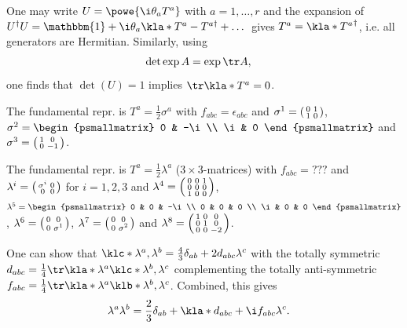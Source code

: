\documentclass[english, parskip=full]{scrbook}
\newcommand{\example}[3]{\begin{tcolorbox}[colback=colorbackgroundexample,colframe=colorexample, breakable,enhanced,title={\textbf{#1}: #2.}]#3\end{tcolorbox}}
\begin{document}
One may write $U=\powe{\i \theta_a T^a}$ with $a=1,\dots,r$ and the expansion of $U^\dagger U = \mathbbm{1} + \i\theta_a \kla*{T^a - T^{a\dagger}} + \dots$ gives $T^a = \kla*{T^a}^\dagger$, i.e. all generators are Hermitian.
Similarly, using 
\begin{align}
\det \exp A &= \exp \tr A,
\end{align}
one finds that $\det(U)=1$ implies $\tr\kla*{T^a}=0$.
\example{$SU(2)$}{\textsc{Pauli} matrices}{
The fundamental repr. is $T^a = \frac{1}{2}\sigma^a$ with $f_{abc}=\epsilon_{abc}$ and $\sigma^1 = \begin{psmallmatrix} 0 & 1 \\ 1 & 0 \end{psmallmatrix}$, $\sigma^2 = \begin{psmallmatrix} 0 & -\i \\ \i & 0 \end{psmallmatrix}$ and $\sigma^3 = \begin{psmallmatrix} 1 & 0 \\ 0 & -1 \end{psmallmatrix}$.
}
\example{$SU(3)$}{\textsc{Gellmann} matrices}{
The fundamental repr. is $T^a = \frac{1}{2}\lambda^a$ ($3\times 3$-matrices) with $f_{abc}=???$ and $\lambda^i = \begin{psmallmatrix} \sigma^i & 0 \\ 0 & 0 \end{psmallmatrix}$ for $i=1,2,3$ and $\lambda^4=\begin{psmallmatrix} 0 & 0 & 1 \\ 0 & 0 & 0 \\ 1 & 0 & 0 \end{psmallmatrix}$, $\lambda^5=\begin{psmallmatrix} 0 & 0 & -\i \\ 0 & 0 & 0 \\ \i & 0 & 0 \end{psmallmatrix}$, $\lambda^6 = \begin{psmallmatrix} 0 & 0 \\ 0 & \sigma^1 \end{psmallmatrix}$, $\lambda^7 = \begin{psmallmatrix} 0 & 0 \\ 0 & \sigma^2 \end{psmallmatrix}$ and $\lambda^8=\begin{psmallmatrix} 1 & 0 & 0 \\ 0 & 1 & 0 \\ 0 & 0 & -2 \end{psmallmatrix}$.

One can show that $\klc*{\lambda^a,\lambda^b} = \frac{4}{3} \delta_{ab} + 2d_{abc}\lambda^c$ with the totally symmetric $d_{abc}=\frac{1}{4} \tr \kla*{\lambda^a\klc*{\lambda^b,\lambda^c}}$ complementing the totally anti-symmetric $f_{abc} = \frac{1}{4} \tr
\kla*{\lambda^a \klb*{\lambda^b,\lambda^c}}$.
Combined, this gives
\begin{align}
\lambda^a\lambda^b &= \frac{2}{3} \delta_{ab} + \kla*{d_{abc} + \i f_{abc}}\lambda^c.
\end{align}
}
\end{document}
